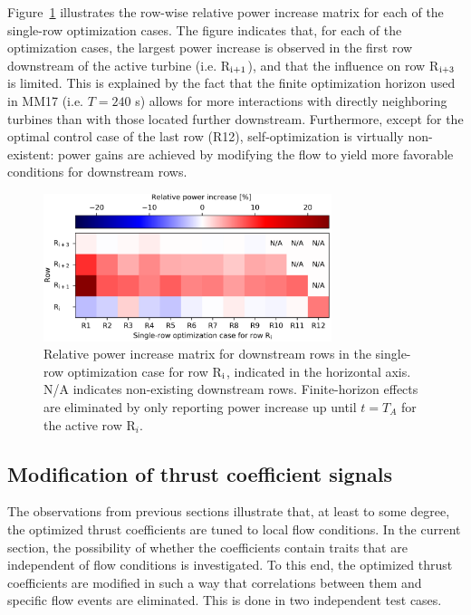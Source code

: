\documentclass[wes, manuscript]{copernicus}
\begin{document}
Figure~\ref{fig:gains_singlerow} illustrates the row-wise relative power increase matrix for each of the single-row optimization cases. The figure indicates that, for each of the optimization cases, the largest power increase is observed in the first row downstream of the active turbine (i.e. R$_{\rm i+1}$), and that the influence on row R$_{\rm i+3}$ is limited. This is explained by the fact that the finite optimization horizon used in MM17 (i.e. $T = 240$ s) allows for more interactions with directly neighboring turbines than with those located further downstream. Furthermore, except for the optimal control case of the last row (R12), self-optimization is virtually non-existent: power gains are achieved by modifying the flow to yield more favorable conditions for downstream rows. 

\begin{figure}
	\centering
	\includegraphics[width=0.75\textwidth]{individual_gains.eps}
	\caption{Relative power increase matrix for downstream rows in the single-row optimization case for row R$_{\rm i}$, indicated in the horizontal axis. N/A indicates non-existing downstream rows. Finite-horizon effects are eliminated by only reporting power increase up until $t = T_A$ for the active row R$_i$. \label{fig:gains_singlerow}}
\end{figure}

\subsection{Modification of thrust coefficient signals}\label{sec:modified_thrust}
The observations from previous sections illustrate that, at least to some degree, the optimized thrust coefficients are tuned to local flow conditions. In the current section, the possibility of whether the coefficients contain traits that are independent of flow conditions is investigated. To this end, the optimized thrust coefficients are modified in such a way that correlations between them and specific flow events are eliminated. This is done in two independent test cases.
\end{document}
